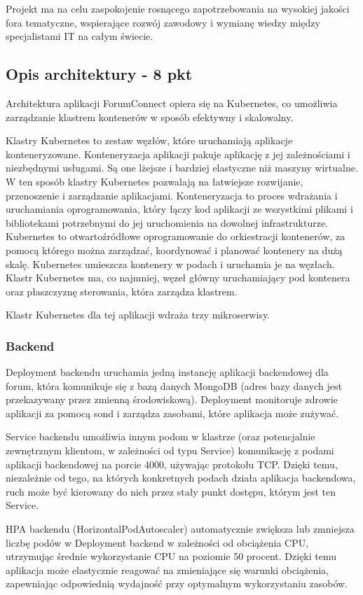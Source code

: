 \documentclass[12pt,a4paper]{article}
\begin{document}
Projekt ma na celu zaspokojenie rosnącego zapotrzebowania na wysokiej jakości fora tematyczne, wspierające rozwój zawodowy i wymianę wiedzy między specjalistami IT na całym świecie.

\subsection{Opis architektury - 8 pkt}
\label{sec:introduction}
Architektura aplikacji ForumConnect opiera się na Kubernetes, co umożliwia zarządzanie klastrem kontenerów w sposób efektywny i skalowalny. 

Klastry Kubernetes to zestaw węzłów, które uruchamiają aplikacje konteneryzowane. Konteneryzacja aplikacji pakuje aplikację z jej zależnościami i niezbędnymi usługami. Są one lżejsze i bardziej elastyczne niż maszyny wirtualne. W ten sposób klastry Kubernetes pozwalają na łatwiejsze rozwijanie, przenoszenie i zarządzanie aplikacjami.
Konteneryzacja to proces wdrażania i uruchamiania oprogramowania, który łączy kod aplikacji ze wszystkimi plikami i bibliotekami potrzebnymi do jej uruchomienia na dowolnej infrastrukturze. Kubernetes to otwartoźródłowe oprogramowanie do orkiestracji kontenerów, za pomocą którego można zarządzać, koordynować i planować kontenery na dużą skalę. Kubernetes umieszcza kontenery w podach i uruchamia je na węzłach. Klastr Kubernetes ma, co najmniej, węzeł główny uruchamiający pod kontenera oraz płaszczyznę sterowania, która zarządza klastrem. \cite{aws.amazon}

Klastr Kubernetes dla tej aplikacji wdraża trzy mikroserwisy.
\subsubsection{Backend}
Deployment backendu uruchamia jedną instancję aplikacji backendowej dla forum, która komunikuje się z bazą danych MongoDB (adres bazy danych jest przekazywany przez zmienną środowiskową). Deployment monitoruje zdrowie aplikacji za pomocą sond i zarządza zasobami, które aplikacja może zużywać.

Service backendu umożliwia innym podom w klastrze (oraz potencjalnie zewnętrznym klientom, w zależności od typu Service) komunikację z podami aplikacji backendowej na porcie 4000, używając protokołu TCP. Dzięki temu, niezależnie od tego, na których konkretnych podach działa aplikacja backendowa, ruch może być kierowany do nich przez stały punkt dostępu, którym jest ten Service. \cite{kuber.docs}

HPA backendu (HorizontalPodAutoscaler) automatycznie zwiększa lub zmniejsza liczbę podów w Deployment backend w zależności od obciążenia CPU, utrzymując średnie wykorzystanie CPU na poziomie 50 procent. Dzięki temu aplikacja może elastycznie reagować na zmieniające się warunki obciążenia, zapewniając odpowiednią wydajność przy optymalnym wykorzystaniu zasobów.
\end{document}
